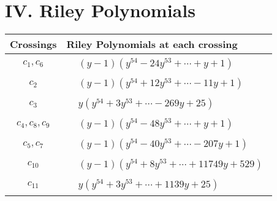 \documentclass[1p]{elsarticle_modified}
\theoremstyle{definition}
\begin{document}
\centering \section*{ IV. Riley Polynomials}
\begin{tabular}{m{50pt}|m{274pt}}
Crossings & \hspace{64pt}Riley Polynomials at each crossing \\
\hline $$\begin{aligned}c_{1},c_{6}\end{aligned}$$&$\begin{aligned}
&(y-1)(y^{54}-24 y^{53}+\cdots+y+1)
\end{aligned}$\\
\hline $$\begin{aligned}c_{2}\end{aligned}$$&$\begin{aligned}
&(y-1)(y^{54}+12 y^{53}+\cdots-11 y+1)
\end{aligned}$\\
\hline $$\begin{aligned}c_{3}\end{aligned}$$&$\begin{aligned}
&y(y^{54}+3 y^{53}+\cdots-269 y+25)
\end{aligned}$\\
\hline $$\begin{aligned}c_{4},c_{8},c_{9}\end{aligned}$$&$\begin{aligned}
&(y-1)(y^{54}-48 y^{53}+\cdots+y+1)
\end{aligned}$\\
\hline $$\begin{aligned}c_{5},c_{7}\end{aligned}$$&$\begin{aligned}
&(y-1)(y^{54}-40 y^{53}+\cdots-207 y+1)
\end{aligned}$\\
\hline $$\begin{aligned}c_{10}\end{aligned}$$&$\begin{aligned}
&(y-1)(y^{54}+8 y^{53}+\cdots+11749 y+529)
\end{aligned}$\\
\hline $$\begin{aligned}c_{11}\end{aligned}$$&$\begin{aligned}
&y(y^{54}+3 y^{53}+\cdots+1139 y+25)
\end{aligned}$\\
\hline
\end{tabular}
\vskip 2pc
\end{document}
